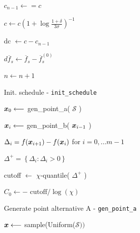 \begin{algorithm}
{    $c_{n-1} \longleftarrow = c$ \;

    $
    c \longleftarrow c\left(1 + \log\frac{1 + \delta}{3 \sigma}\right)^{-1}
    $

    dc $\longleftarrow c - c_{n-1}$ \;

     {
        $d\overline{f}_s \longleftarrow \overline{f}_s - \overline{f}_s^{(0)}$ \;

        \vspace{5pt}

        {
             \;
        }
        
        \vspace{5pt}
    }

    $n \longleftarrow n+1 $ \;

}

\end{algorithm}

\begin{algorithm}
\caption{Init. schedule - \texttt{init\_schedule}}\label{algo:sa}
\vspace{8pt}
\nosemic
\SetAlgoLined


$\boldsymbol{x}_0 \longleftarrow$ gen\_point\_a( $\mathcal{S}$ ) \;

 {
    $\boldsymbol{x}_i \longleftarrow $ gen\_point\_b( $\boldsymbol{x}_{i-1}$ ) \;
}

$\Delta_i = f(\boldsymbol{x}_{i+1}) - f(\boldsymbol{x}_i)$ for $i = 0,\ldots m-1$ \;

$\Delta^+ = \left\lbrace \Delta_i : \Delta_i > 0 \right\rbrace $ \;

cutoff $\longleftarrow$ $\chi$-quantile( $\Delta^+$ ) \;

$C_0 \longleftarrow -\text{ cutoff} / \log(\chi)$ \;

 \;


\end{algorithm}

\begin{algorithm}
\caption{Generate point alternative A - \texttt{gen\_point\_a}}\label{algo:sa}
\vspace{8pt}
\nosemic
\SetAlgoLined
{}

$\boldsymbol{x} \longleftarrow$ sample(Uniform($\mathcal{S})) $ \;


\end{algorithm}

